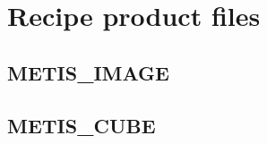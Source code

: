 \section{Recipe product files}
\label{app:recipe_products}

\subsection{METIS\_IMAGE}
\label{sapp:METIS_IMAGE}

\subsection{METIS\_CUBE}
\label{sapp:METIS_CUBE}


